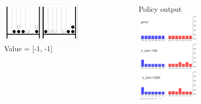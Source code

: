 \documentclass[aspectratio=169,xcolor=dvipsnames]{beamer}
\begin{document}
\begin{frame}{}
    \begin{columns}[c] %
\begin{figure}[h]
    \centering
    \includegraphics[width=0.9\textwidth]{state.png}
    \label{fig:intro}
    Value = [-1, -1]
\end{figure}
\begin{figure}[h]
    Policy output
    \centering
    \includegraphics[width=0.7\textwidth]{prob2.png}
    \label{fig:intro}
\end{figure}
    \end{columns}
\end{frame}
\end{document}
